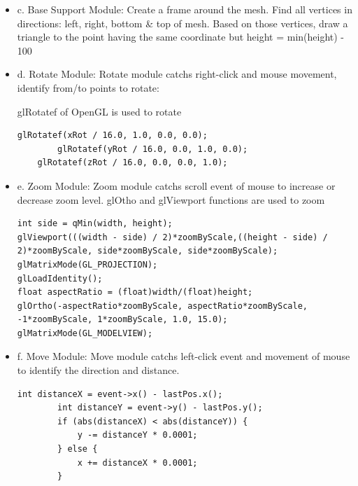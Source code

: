\documentclass[11pt]{article}
\begin{document}
\begin{itemize}
\item c. Base Support Module:
Create a frame around the mesh.
Find all vertices in directions: left, right, bottom \& top of mesh. Based on those vertices, draw a triangle to the point having the same coordinate but height = min(height) - 100

\item d. Rotate Module:
Rotate module catchs right-click and mouse movement, identify from/to points to rotate:

glRotatef of OpenGL is used to rotate
\begin{lstlisting}
glRotatef(xRot / 16.0, 1.0, 0.0, 0.0);
    	glRotatef(yRot / 16.0, 0.0, 1.0, 0.0);
    glRotatef(zRot / 16.0, 0.0, 0.0, 1.0);
\end{lstlisting}

\item e. Zoom Module:
Zoom module catchs scroll event of mouse to increase or decrease zoom level.
glOtho and glViewport functions are used to zoom
\begin{lstlisting}[breaklines=true]
int side = qMin(width, height);
glViewport(((width - side) / 2)*zoomByScale,((height - side) / 2)*zoomByScale, side*zoomByScale, side*zoomByScale);
glMatrixMode(GL_PROJECTION);
glLoadIdentity();
float aspectRatio = (float)width/(float)height;
glOrtho(-aspectRatio*zoomByScale, aspectRatio*zoomByScale, -1*zoomByScale, 1*zoomByScale, 1.0, 15.0);
glMatrixMode(GL_MODELVIEW);
\end{lstlisting}

\item f. Move Module:
Move module catchs left-click event and movement of mouse to identify the direction and distance.
\begin{lstlisting}
int distanceX = event->x() - lastPos.x();
        int distanceY = event->y() - lastPos.y();
        if (abs(distanceX) < abs(distanceY)) {
            y -= distanceY * 0.0001;
        } else {
            x += distanceX * 0.0001;
        }
\end{lstlisting}
\end{itemize}
\end{document}
